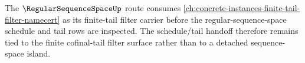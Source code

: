 The $\RegularSequenceSpaceUp$ route consumes \autoref{ch:concrete-instances-finite-tail-filter-namecert} as its finite-tail filter carrier before the regular-sequence-space schedule and tail rows are inspected. The schedule/tail handoff therefore remains tied to the finite cofinal-tail filter surface rather than to a detached sequence-space island.

